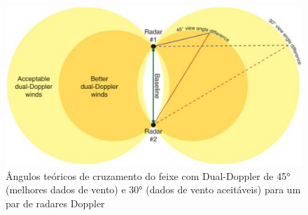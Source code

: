 \begin{figure}[htb]
	\begin{center}
		\caption{Ângulos teóricos de cruzamento do feixe com Dual-Doppler de \ang{45} (melhores dados de vento) e \ang{30} (dados de vento aceitáveis) para um par de radares Doppler} 
		\label{doppler_theory_lobes}
		\includegraphics[width=\columnwidth]{figs/lobes_eastin.png}
	\end{center}
\end{figure}

